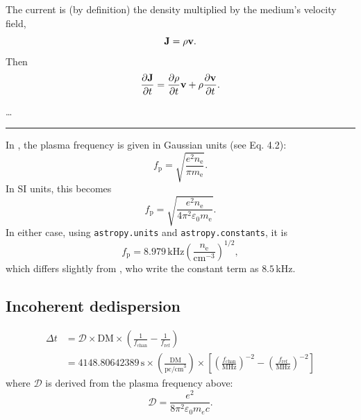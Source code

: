 \documentclass{book}
\newcommand{\pd}[2]{\frac{\partial {#1}}{\partial {#2}}}
\begin{document}
The current is (by definition) the density multiplied by the medium's velocity field,
\begin{equation}
    {\bf J} = \rho {\bf v}.
\end{equation}
Then
\begin{equation}
    \pd{\bf J}{t} = \pd{\rho}{t} {\bf v} + \rho\pd{\bf v}{t}.
\end{equation}

\dots

\noindent\rule{\textwidth}{1pt}

In \citet{Lorimer2005}, the plasma frequency is given in Gaussian units (see Eq. 4.2):
\begin{equation}
    f_\text{p} = \sqrt{\frac{e^2 n_\text{e}}{\pi m_\text{e}}}.
\end{equation}
In SI units, this becomes
\begin{equation}
    f_\text{p} = \sqrt{\frac{e^2 n_\text{e}}{4\pi^2\varepsilon_0 m_\text{e}}}.
\end{equation}
In either case, using \texttt{astropy.units} and \texttt{astropy.constants}, it is
\begin{equation}
    f_\text{p} = 8.979\,\text{kHz} \left(\frac{n_\text{e}}{\text{cm}^{-3}}\right)^{1/2},
\end{equation}
which differs slightly from \citeauthor{Lorimer2005}, who write the constant term as $8.5\,$kHz.

\subsection{Incoherent dedispersion}

\begin{equation}
\begin{aligned}
    \Delta t
        &= \mathcal{D} \times \text{DM} \times \left( \frac{1}{f_\text{chan}} - \frac{1}{f_\text{ref}} \right) \\
        &= 4148.80642389\,\text{s} \times
          \left(\frac{\text{DM}}{\text{pc/cm}^3}\right) \times \left[
              \left(\frac{f_\text{chan}}{\text{MHz}}\right)^{-2} -
              \left(\frac{f_\text{ref}}{\text{MHz}}\right)^{-2} \right]
\end{aligned}
\end{equation}
where $\mathcal{D}$ is derived from the plasma frequency above:
\begin{equation}
    \mathcal{D} = \frac{e^2}{8\pi^2\varepsilon_0 m_e c}.
\end{equation}
\end{document}
